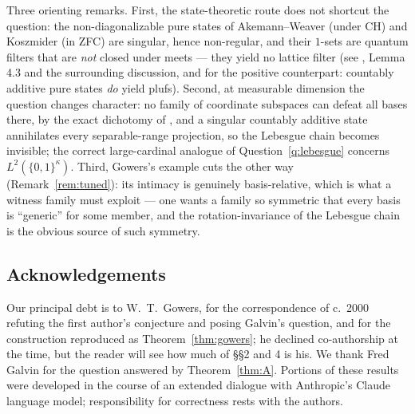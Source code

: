 \documentclass[11pt,reqno]{amsart}
\theoremstyle{definition}
\begin{document}
Three orienting remarks. First, the state-theoretic route does not shortcut the
question: the non-diagonalizable pure states of Akemann--Weaver \cite{AW} (under CH) and
Koszmider \cite{Koszmider} (in ZFC) are singular, hence non-regular, and their
$1$-sets are quantum filters that are \emph{not} closed under meets --- they yield no
lattice filter (see \cite{BlecherWeaver}, Lemma 4.3 and the surrounding discussion, and
\cite{FWIII} for the positive counterpart: countably additive pure states \emph{do}
yield plufs). Second, at measurable dimension the question changes character: no family
of coordinate subspaces can defeat all bases there, by the exact dichotomy of
\cite{FWIII}, and a singular countably additive state annihilates every separable-range
projection, so the Lebesgue chain becomes invisible; the correct large-cardinal analogue
of Question~\ref{q:lebesgue} concerns $L^2(\{0,1\}^\kappa)$. Third, Gowers's example
cuts the other way (Remark~\ref{rem:tuned}): its intimacy is genuinely basis-relative,
which is what a witness family must exploit --- one wants a family so symmetric that
every basis is ``generic'' for some member, and the rotation-invariance of the Lebesgue
chain is the obvious source of such symmetry.

\subsection*{Acknowledgements}
Our principal debt is to W.~T.~Gowers, for the correspondence of c.~2000 refuting the
first author's conjecture and posing Galvin's question, and for the construction
reproduced as Theorem~\ref{thm:gowers}; he declined co-authorship at the time, but the
reader will see how much of \S\S2 and 4 is his. We thank Fred Galvin for the question
answered by Theorem~\ref{thm:A}. Portions of these results were developed in the course
of an extended dialogue with Anthropic's Claude language model; responsibility for
correctness rests with the authors.
\end{document}
